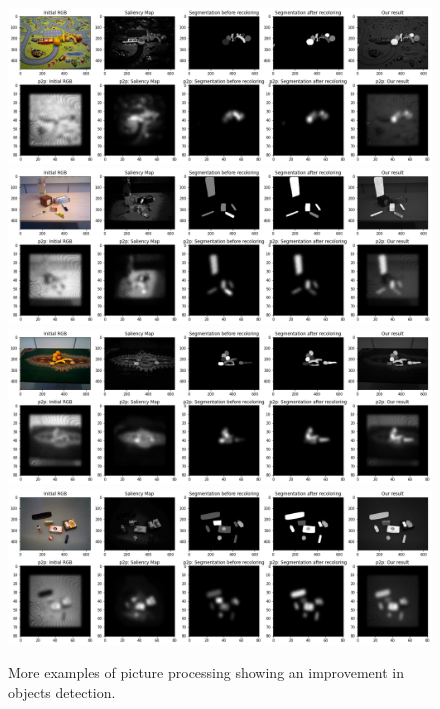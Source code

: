 \begin{figure}[h!]
    \centering
    \includegraphics[width=0.8\linewidth]{figures/appendix1.png}
    \includegraphics[width=0.8\linewidth]{figures/appendix2.png}
    \includegraphics[width=0.8\linewidth]{figures/appendix3.png}
    \includegraphics[width=0.8\linewidth]{figures/appendix4.png}
    \caption{More examples of picture processing showing an improvement in objects detection.}
    \label{appendices:processing}
\end{figure}